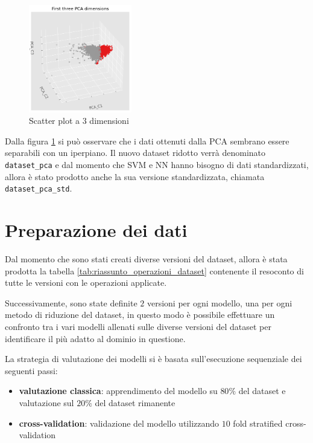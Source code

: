 \begin{figure}[!ht]
      \centering
      \includegraphics[width=0.4\textwidth]{img/analisi/pcaNuovoDataset.png}
      \caption{Scatter plot a 3 dimensioni}
      \label{fig:pca-3d}
\end{figure}

Dalla figura \ref{fig:pca-3d} si può osservare che i dati ottenuti dalla PCA
sembrano essere separabili con un iperpiano. Il nuovo dataset ridotto verrà 
denominato \texttt{dataset\_pca} e dal momento che SVM e NN hanno bisogno di dati
standardizzati, allora è stato prodotto anche la sua versione standardizzata,
chiamata \texttt{dataset\_pca\_std}. 

\section{Preparazione dei dati} \label{sec:preparazione_dei_dati}
Dal momento che sono stati creati diverse versioni del dataset, allora è stata 
prodotta la tabella \ref{tab:riassunto_operazioni_dataset} contenente il resoconto
di tutte le versioni con le operazioni applicate.

Successivamente, sono state definite $2$ versioni per ogni modello, una per ogni 
metodo di riduzione del dataset, in questo modo è possibile effettuare un confronto
tra i vari modelli allenati sulle diverse versioni del dataset per identificare 
il più adatto al dominio in questione. 

La strategia di valutazione dei modelli si è basata sull'esecuzione sequenziale 
dei seguenti passi:
\begin{itemize}
      \item \textbf{valutazione classica}: apprendimento del modello su $80\%$ del
      dataset e valutazione sul $20\%$ del dataset rimanente
      \item \textbf{cross-validation}: validazione del modello utilizzando 
      $10$ fold stratified cross-validation
\end{itemize}

